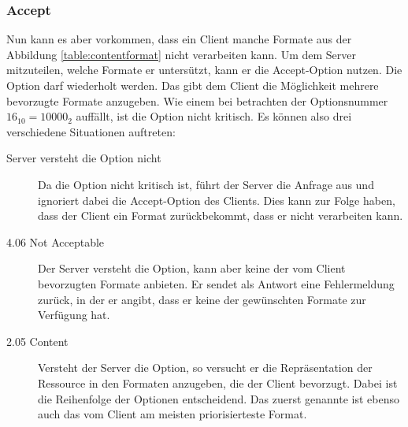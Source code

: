 \subsubsection{Accept}
\label{option:accept}
Nun kann es aber vorkommen, dass ein Client manche Formate aus der Abbildung \ref{table:contentformat} 
nicht verarbeiten kann. Um dem Server mitzuteilen, welche Formate er untersützt, kann er die
Accept-Option nutzen. 
Die Option darf wiederholt werden.
Das gibt dem Client die Möglichkeit mehrere bevorzugte Formate anzugeben. 
Wie einem bei betrachten der Optionsnummer $16_{10}=10000_{2}$ auffällt, ist die Option nicht kritisch.
Es können also drei verschiedene Situationen auftreten:
\begin{description}
\item[Server versteht die Option nicht] Da die Option nicht kritisch ist, führt der Server die Anfrage aus und
ignoriert dabei die Accept-Option des Clients. Dies kann zur Folge haben, dass
der Client ein Format zurückbekommt, dass er nicht verarbeiten kann.
\item[4.06 Not Acceptable] Der Server versteht die Option, kann aber keine der vom Client bevorzugten
Formate anbieten. Er sendet als Antwort eine Fehlermeldung zurück, in der er
angibt, dass er keine der gewünschten Formate zur Verfügung hat.  
\item[2.05 Content] Versteht der Server die Option, so versucht er die Repräsentation der Ressource
in den Formaten anzugeben, die der Client bevorzugt. Dabei ist die Reihenfolge
der Optionen entscheidend. Das zuerst genannte ist ebenso auch das vom Client
am meisten priorisierteste Format.
\end{description}


